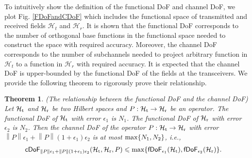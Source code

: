 \documentclass[12pt,draftclsnofoot,journal,onecolumn]{IEEEtran}
\newtheorem{theorem}{Theorem}
\begin{document}
	To intuitively show the definition of the functional DoF and channel DoF, we plot Fig. \ref{FDoFandCDoF} which includes the functional space of transmitted and received fields $\mathcal{H}_t$ and $\mathcal{H}_r$. It is shown that the functional DoF corresponds to the number of orthogonal base functions in the functional space needed to construct the space with required accuracy. Moreover, the channel DoF corresponds to the number of subchannels needed to project arbitrary function in $\mathcal{H}_t$ to a function in $\mathcal{H}_r$ with required accuracy. It is expected that the channel DoF is upper-bounded by the functional DoF of the fields at the transceivers. We provide the following theorem to rigorously prove their relationship. 
	
	\begin{theorem}
		(The relationship between the functional DoF and the channel DoF) Let $\mathcal{H}_{\rm t}$ and $\mathcal{H}_{\rm r}$ be two Hilbert spaces and $P:\mathcal{H}_{\rm t} \rightarrow \mathcal{H}_{\rm r}$ be an operator. The functional DoF of $\mathcal{H}_{\rm t}$ with error $\epsilon_1$ is $N_1$. The functional DoF of $\mathcal{H}_{\rm r}$ with error $\epsilon_2$ is $N_2$. Then the channel DoF of the operator $P: \mathcal{H}_{\rm t} \rightarrow \mathcal{H}_{\rm r}$ with error $\left\| P \right\| \epsilon_1 + \left\|  P \right\| (1+\epsilon_1) \epsilon_2$ is at most ${\rm max}\{N_1,N_2\}$, i.e.,
		\begin{equation}
			\begin{aligned}
			&\mathsf{cDoF}_{\left\| P \right\| \epsilon_1 + \left\|  P \right\| (1+\epsilon_1) \epsilon_2}({\mathcal{H}_{\rm t}},{\mathcal{H}_{\rm r}},P) \leqslant {\rm max}\{\mathsf{fDoF}_{\epsilon_1}(\mathcal{H}_{\rm t}),\mathsf{fDoF}_{\epsilon_2}(\mathcal{H}_{\rm r})\}.
			\end{aligned}
		\end{equation}
	\end{theorem}
	
\end{document}
